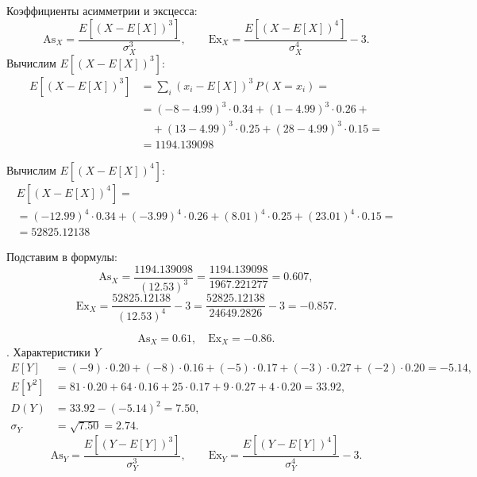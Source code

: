 \documentclass[a4paper,14pt]{extarticle}
\begin{document}
            Коэффициенты асимметрии и эксцесса:
            \[
                \mathrm{As}_X = \frac{E[(X - E[X])^3]}{\sigma_X^3},
                \qquad
                \mathrm{Ex}_X = \frac{E[(X - E[X])^4]}{\sigma_X^4} - 3.
            \]
            Вычислим $E[(X - E[X])^3]$:
            \[
                \begin{aligned}
                    E[(X - E[X])^3] &= \sum_i (x_i - E[X])^3 \, P(X=x_i) = \\
                    &= (-8 - 4.99)^3 \cdot 0.34 + (1 - 4.99)^3 \cdot 0.26 + \\
                    &\quad + (13 - 4.99)^3 \cdot 0.25 + (28 - 4.99)^3 \cdot 0.15 = \\
                    &= 1194.139098
                \end{aligned}
            \]
            
            Вычислим $E[(X - E[X])^4]$:
            \begin{gather*}
                E[(X - E[X])^4] = \\
                = (-12.99)^4 \cdot 0.34 + (-3.99)^4 \cdot 0.26 + (8.01)^4 \cdot 0.25 + (23.01)^4 \cdot 0.15 = \\
                = 52825.12138
            \end{gather*}
            
            Подставим в формулы:
            \[
                \mathrm{As}_X = \frac{1194.139098}{(12.53)^3} = \frac{1194.139098}{1967.221277} = 0.607,
            \]
            \[
                \mathrm{Ex}_X = \frac{52825.12138}{(12.53)^4} - 3 = \frac{52825.12138}{24649.2826} - 3 = -0.857.
            \]
            
            \[
                \boxed{\mathrm{As}_X = 0.61, \quad \mathrm{Ex}_X = -0.86.}
            \]
            . Характеристики $Y$
            \[
                \begin{aligned}
                    E[Y] &= (-9)\cdot0.20 + (-8)\cdot0.16 + (-5)\cdot0.17 + (-3)\cdot0.27 + (-2)\cdot0.20 = -5.14,\\
                    E[Y^2] &= 81\cdot0.20 + 64\cdot0.16 + 25\cdot0.17 + 9\cdot0.27 + 4\cdot0.20 = 33.92,\\
                    D(Y) &= 33.92 - (-5.14)^2 = 7.50,\\
                    \sigma_Y &= \sqrt{7.50} = 2.74.
                \end{aligned}
            \]
            \[
                \mathrm{As}_Y = \frac{E[(Y - E[Y])^3]}{\sigma_Y^3},
                \qquad
                \mathrm{Ex}_Y = \frac{E[(Y - E[Y])^4]}{\sigma_Y^4} - 3.
            \]
            
\end{document}
